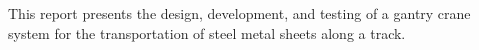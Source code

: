 \begin{Abstract}{}

This report presents the design, development, and testing of a gantry crane system for the transportation of steel metal sheets along a track.


\end{Abstract}
